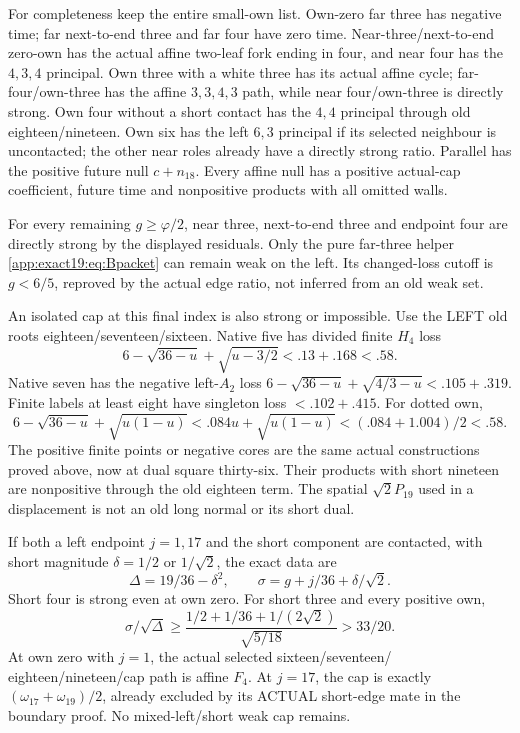 \documentclass[11pt]{article}
\theoremstyle{definition}
\theoremstyle{remark}
\begin{document}
For completeness keep the entire
small-own list.
Own-zero far three has negative
time; far next-to-end three and
far four have zero time.
Near-three/next-to-end zero-own
has the actual affine two-leaf
fork ending in four, and near
four has the \(4,3,4\) principal.
Own three with a white three
has its actual affine cycle;
far-four/own-three has the affine
\(3,3,4,3\) path, while near
four/own-three is directly strong.
Own four without a short contact
has the \(4,4\) principal through
old eighteen/nineteen.
Own six has the left \(6,3\)
principal if its selected neighbour
is uncontacted; the other near
roles already have a directly
strong ratio.
Parallel has the positive future
null \(c+n_{18}\).
Every affine null has a positive
actual-cap coefficient, future
time and nonpositive products
with all omitted walls.

For every remaining \(g\ge\varphi/2\),
near three, next-to-end three
and endpoint four are directly
strong by the displayed residuals.
Only the pure far-three helper
\eqref{app:exact19:eq:Bpacket}
can remain weak on the left.
Its changed-loss cutoff is
\(g<6/5\), reproved by the actual
edge ratio, not inferred from an
old weak set.

An isolated cap at this final
index is also strong or impossible.
Use the LEFT old roots
eighteen/seventeen/sixteen.
Native five has divided finite
\(H_4\) loss
\[
        6-\sqrt{36-u}+\sqrt{u-3/2}<.13+.168<.58 .
\]
Native seven has the negative
left-\(A_2\) loss
\(6-\sqrt{36-u}+\sqrt{4/3-u}<.105+.319\).
Finite labels at least eight
have singleton loss
\(<.102+.415\).
For dotted own,
\[
 6-\sqrt{36-u}+\sqrt{u(1-u)}
       <.084u+\sqrt{u(1-u)}
       <(.084+1.004)/2<.58 .
\]
The positive finite points or
negative cores are the same actual
constructions proved above, now
at dual square thirty-six.
Their products with short nineteen
are nonpositive through the old
eighteen term.
The spatial \(\sqrt2P_{19}\) used
in a displacement is not an old
long normal or its short dual.

If both a left endpoint \(j=1,17\)
and the short component are
contacted, with short magnitude
\(\delta=1/2\) or \(1/\sqrt2\),
the exact data are
\[
             \Delta=19/36-\delta^2,\qquad
             \sigma=g+j/36+\delta/\sqrt2 .
\]
Short four is strong even at
own zero.
For short three and every
positive own,
\[
 \sigma/\sqrt\Delta\ge
 \frac{1/2+1/36+1/(2\sqrt2)}{\sqrt{5/18}}>33/20 .
\]
At own zero with \(j=1\), the
actual selected sixteen/seventeen/
eighteen/nineteen/cap path is
affine \(F_4\).
At \(j=17\), the cap is exactly
\((\omega_{17}+\omega_{19})/2\),
already excluded by its ACTUAL
short-edge mate in the boundary
proof.
No mixed-left/short weak cap
remains.
\end{document}
